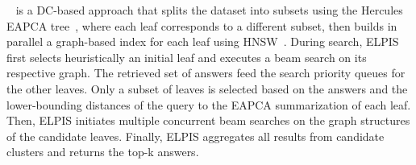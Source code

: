 ~\cite{elpis} is a DC-based approach that splits the dataset into subsets using the Hercules EAPCA tree~\cite{hercules}, where each leaf corresponds to a different subset, then builds in parallel a graph-based index for each leaf using HNSW~\cite{hnsw}. During search, ELPIS first selects heuristically an initial leaf %
and executes a beam search on its respective graph. 
The retrieved set of answers feed the search priority queues for the other leaves. 
Only a subset of leaves is selected based on the answers and the lower-bounding distances of the query to the EAPCA summarization of each leaf.  Then, ELPIS initiates multiple concurrent beam searches on the graph structures of the candidate leaves. 
Finally, ELPIS aggregates all results from candidate clusters and returns the top-k answers. 